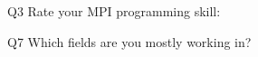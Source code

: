 \begin{description}%
\item{Q3} Rate your MPI programming skill:%
\item{Q7} Which fields are you mostly working in?%
\end{description}%
